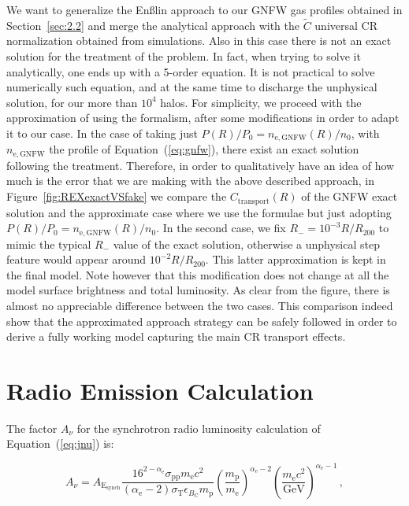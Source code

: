 \documentclass[traditabstract]{aa}
\newcommand{\rmn}{\mathrm}
\begin{document}
\begin{appendix}
We want to generalize the En{\ss}lin approach to our GNFW gas profiles obtained in Section~\ref{sec:2.2} and merge the \cite{2011A&A...527A..99E} analytical approach with the $\tilde{C}$ universal CR normalization obtained from simulations. Also in this case there is not an exact solution for the \cite{2011A&A...527A..99E} treatment of the problem. In fact, when trying to solve it analytically, one ends up with a 5-order equation. It is not practical to solve numerically such equation, and at the same time to discharge the unphysical solution, for our more than $10^4$ halos. For simplicity, we proceed with the approximation of using the \cite{2011A&A...527A..99E} formalism, after some modifications in order to adapt it to our case. In the case of taking just $P(R)/P_{0}=n_{\rmn{e,GNFW}}(R)/n_{0}$, with $n_{\rmn{e,GNFW}}$ the profile of Equation~(\ref{eq:gnfw}), there exist an exact solution following the \cite{2011A&A...527A..99E} treatment. Therefore, in order to qualitatively have an idea of how much is the error that we are making with the above described approach, in Figure~\ref{fig:REXexactVSfake} we compare the $C_{\rmn{transport}}(R)$ of the GNFW exact solution and the approximate case where we use the \cite{2011A&A...527A..99E} formulae but just adopting $P(R)/P_{0}=n_{\rmn{e,GNFW}}(R)/n_{0}$. In the second case, we fix $R_{-}=10^{-3}R/R_{200}$ to mimic the typical $R_{-}$ value of the exact solution, otherwise a unphysical step feature would appear around $10^{-2}R/R_{200}$. This latter approximation is kept in the final model. Note however that this modification does not change at all the model surface brightness and total luminosity. As clear from the figure, there is almost no appreciable difference between the two cases. This comparison indeed show that the approximated approach strategy can be safely followed in order to derive a fully working model capturing the main CR transport effects.


\section{Radio Emission Calculation}
\label{app:A}

The factor $A_{\nu}$ for the synchrotron radio luminosity calculation of Equation~(\ref{eq:jnu}) is:

\begin{equation}
A_{\nu} = A_{\rmn{E_{synch}}} \frac{16^{2-\alpha_{\rmn{e}}}\sigma_{\rmn{pp}}m_{\rmn{e}}c^{2}}{(\alpha_{\rmn{e}}-2)\sigma_{\rmn{T}}\epsilon_{B_{\rmn{C}}}m_{\rmn{p}}}\left(\frac{m_{\rmn{p}}
}{m_{\rmn{e}}}\right)^{\alpha_{\rmn{e}}-2} \left(\frac{m_{\rmn{e}}c^{2}}{\rmn{GeV}}\right)^{\alpha_{\rmn{e}}-1} \, ,
\end{equation}


\end{appendix}
\end{document}
